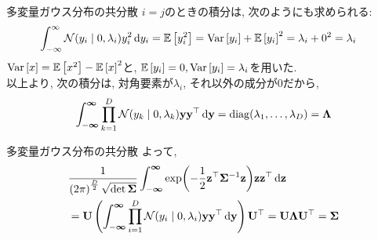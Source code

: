 \documentclass[dvipdfmx,notheorems,t]{beamer}
\begin{document}
\begin{frame}{多変量ガウス分布の共分散}
$i = j$のときの積分は, 次のようにも求められる:
\begin{align*}
  \int_{-\infty}^\infty \mathcal{N}(y_i \mid 0, \lambda_i) y_i^2 \dd{y_i}
  &= \operatorname{\mathbb{E}} \left[ y_i^2 \right] = \operatorname{Var} \left[ y_i \right] + \operatorname{\mathbb{E}} \left[ y_i \right]^2 = \lambda_i + 0^2 = \lambda_i
\end{align*}
$\operatorname{Var} \left[ x \right] = \operatorname{\mathbb{E}} \left[ x^2 \right] - \operatorname{\mathbb{E}} \left[ x \right]^2$と, $\operatorname{\mathbb{E}} \left[ y_i \right] = 0, \operatorname{Var} \left[ y_i \right] = \lambda_i$を用いた. \\
以上より, 次の積分は, 対角要素が$\lambda_i$, それ以外の成分が0だから,
\begin{align*}
  \int_{-\boldsymbol{\infty}}^{\boldsymbol{\infty}}
    \prod_{k = 1}^D \mathcal{N}(y_k \mid 0, \lambda_k)
    \vb{y} \vb{y}^\top \dd{\vb{y}}
  = \operatorname{diag}(\lambda_1, \ldots, \lambda_D)
  = \vb{\Lambda}
\end{align*}
\end{frame}

\begin{frame}{多変量ガウス分布の共分散}
よって,
\begin{align*}
  & \frac{1}{\left( 2\pi \right)^\frac{D}{2} \sqrt{\det \vb{\Sigma}}}
  \int_{-\boldsymbol{\infty}}^{\boldsymbol{\infty}}
    \exp(-\frac{1}{2} \vb{z}^\top \vb{\Sigma}^{-1} \vb{z}) \vb{z} \vb{z}^\top \dd{\vb{z}} \\
  &= \vb{U} \left( \int_{-\boldsymbol{\infty}}^{\boldsymbol{\infty}}
    \prod_{i = 1}^D \mathcal{N}(y_i \mid 0, \lambda_i)
    \vb{y} \vb{y}^\top \dd{\vb{y}} \right) \vb{U}^\top
  = \vb{U} \vb{\Lambda} \vb{U}^\top = \vb{\Sigma}
\end{align*}
\end{frame}
\end{document}
